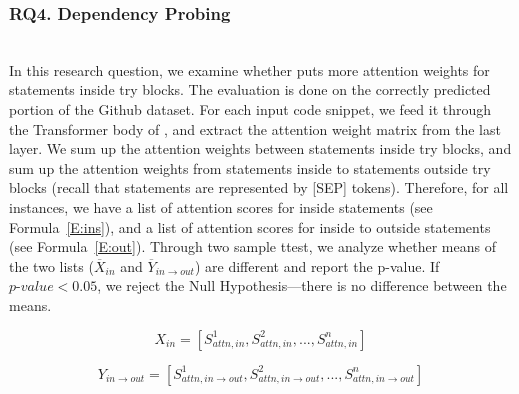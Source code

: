 \subsubsection{RQ4. Dependency Probing}~\\
In this research question, we examine whether {\tool} puts more attention weights for statements inside try blocks. The evaluation is done on the correctly predicted portion of the Github dataset. For each input code snippet, we feed it through the Transformer body of {\tool}, and extract the attention weight matrix from the last layer. We sum up the attention weights between statements inside try blocks, and sum up the attention weights from statements inside to statements outside try blocks (recall that statements are represented by [SEP] tokens). Therefore, for all instances, we have a list of attention scores for inside statements (see Formula~\ref{E:ins}), and a list of attention scores for inside to outside statements (see Formula~\ref{E:out}). Through two sample t\text{-}test, we analyze whether means of the two lists ($\overline{X}_{in}$ and $\overline{Y}_{in\rightarrow out}$) are different and report the p-value. If $p\text{-}value < 0.05$, we reject the Null Hypothesis---there is no difference between the means.

\begin{equation}\label{E:ins}
X_{in} = [ S^{1}_{attn, in}, S^{2}_{attn, in}, ... , S^{n}_{attn, in} ]
\end{equation}

\begin{equation}\label{E:out}
Y_{in\rightarrow out} = [ S^{1}_{attn, in\rightarrow out}, S^{2}_{attn, in\rightarrow out}, ... , S^{n}_{attn, in\rightarrow out} ]
\end{equation}
 
